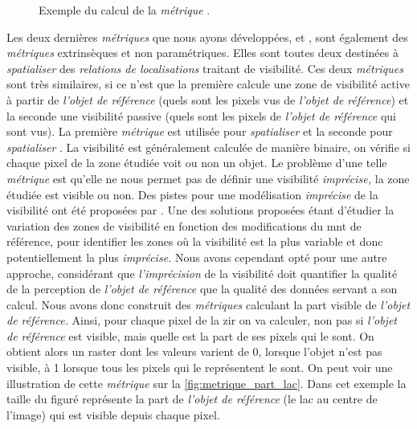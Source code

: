 \begin{figure}
  \centering
  
  \caption{Exemple du calcul de la \emph{métrique}
    \protect{}.}
  \label{fig:metrique_temps_marche}
\end{figure}

Les deux dernières \emph{métriques} que nous ayons
développées, et , sont également
des \emph{métriques} extrinsèques et non paramétriques. Elles sont
toutes deux destinées à \emph{spatialiser} des \emph{relations de
  localisations} traitant de visibilité. Ces deux \emph{métriques}
sont très similaires, si ce n'est que la première calcule une zone de
visibilité active à partir de \emph{l'objet de référence} (\ie quels
sont les pixels vus de \emph{l'objet de référence}) et la seconde une
visibilité passive (\ie quels sont les pixels de \emph{l'objet de
  référence} qui sont vus). La première \emph{métrique} est utilisée
pour \emph{spatialiser}  et la seconde
pour \emph{spatialiser} . La visibilité
est généralement calculée de manière binaire, on vérifie si chaque
pixel de la zone étudiée voit ou non un objet. Le problème d'une telle
\emph{métrique} est qu'elle ne nous permet pas de définir une
visibilité \emph{imprécise,} la zone étudiée est visible ou non. Des
pistes pour une modélisation \emph{imprécise} de la visibilité ont été
proposées par \textcite{}. Une des solutions proposées étant d'étudier
la variation des zones de visibilité en fonction des modifications du
\ac{mnt} de référence, pour identifier les zones où la visibilité est
la plus variable et donc potentiellement la plus \emph{imprécise.}
Nous avons cependant opté pour une autre approche, considérant que
\emph{l'imprécision} de la visibilité doit quantifier la qualité de la
perception de \emph{l'objet de référence} que la qualité des données
servant a son calcul. Nous avons donc construit des \emph{métriques}
calculant la part visible de \emph{l'objet de référence.} Ainsi, pour
chaque pixel de la \ac{zir} on va calculer, non pas si \emph{l'objet
  de référence} est visible, mais quelle est la part de ses pixels qui
le sont. On obtient alors un raster dont les valeurs varient de 0,
lorsque l'objet n'est pas visible, à 1 lorsque tous les pixels qui le
représentent le sont. On peut voir une illustration de cette
\emph{métrique} sur la \autoref{fig:metrique_part_lac}. Dans cet
exemple la taille du figuré représente la part de \emph{l'objet de
  référence} (le lac au centre de l'image) qui est visible depuis
chaque pixel.

